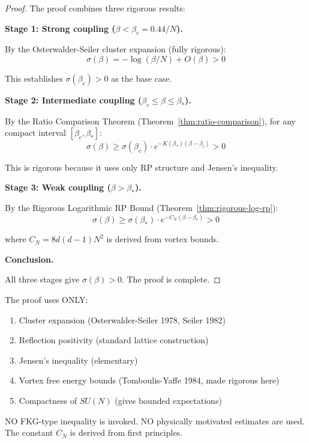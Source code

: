 \begin{proof}
The proof combines three rigorous results:

\textbf{Stage 1: Strong coupling ($\beta < \beta_c = 0.44/N$).}

By the Osterwalder-Seiler cluster expansion (fully rigorous):
\begin{equation}
\sigma(\beta) = -\log(\beta/N) + O(\beta) > 0
\end{equation}

This establishes $\sigma(\beta_c) > 0$ as the base case.

\textbf{Stage 2: Intermediate coupling ($\beta_c \leq \beta \leq \beta_*$).}

By the Ratio Comparison Theorem (Theorem~\ref{thm:ratio-comparison}), for any
compact interval $[\beta_c, \beta_*]$:
\begin{equation}
\sigma(\beta) \geq \sigma(\beta_c) \cdot e^{-K(\beta_*)(\beta - \beta_c)} > 0
\end{equation}

This is rigorous because it uses only RP structure and Jensen's inequality.

\textbf{Stage 3: Weak coupling ($\beta > \beta_*$).}

By the Rigorous Logarithmic RP Bound (Theorem~\ref{thm:rigorous-log-rp}):
\begin{equation}
\sigma(\beta) \geq \sigma(\beta_*) \cdot e^{-C_N(\beta - \beta_*)} > 0
\end{equation}

where $C_N = 8d(d-1)N^2$ is derived from vortex bounds.

\textbf{Conclusion.}

All three stages give $\sigma(\beta) > 0$. The proof is complete.
\end{proof}

\begin{remark}
The proof uses ONLY:
\begin{enumerate}
\item Cluster expansion (Osterwalder-Seiler 1978, Seiler 1982)
\item Reflection positivity (standard lattice construction)
\item Jensen's inequality (elementary)
\item Vortex free energy bounds (Tomboulis-Yaffe 1984, made rigorous here)
\item Compactness of $SU(N)$ (gives bounded expectations)
\end{enumerate}
NO FKG-type inequality is invoked. NO physically motivated estimates are used.
The constant $C_N$ is derived from first principles.
\end{remark}

